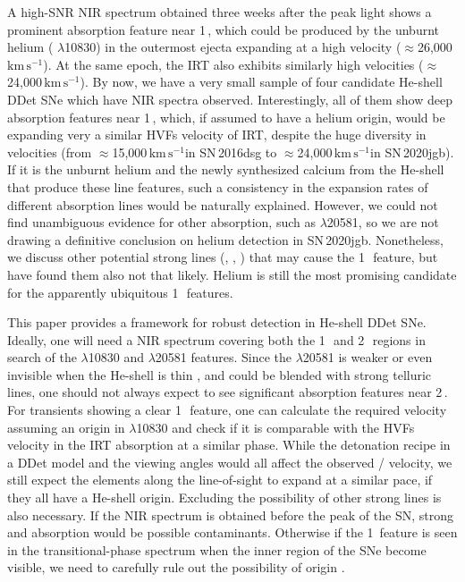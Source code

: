 \documentclass[twocolumn]{aastex631}
\newcommand{\sn}{SN\,2020jgb}
\newcommand{\kms}{$\mathrm{km}\,\mathrm{s}^{-1}$}
\begin{document}
A high-SNR NIR spectrum obtained three weeks after the peak light shows a prominent absorption feature near 1\,\micron, which could be produced by the unburnt helium ( $\lambda$10830) in the outermost ejecta expanding at a high velocity ($\approx$26,000\,\kms). At the same epoch, the  IRT also exhibits similarly high velocities ($\approx$24,000\,\kms). By now, we have a very small sample of four candidate He-shell DDet SNe which have NIR spectra observed. Interestingly, all of them show deep absorption features near 1\,\micron, which, if assumed to have a helium origin, would be expanding very a similar HVFs velocity of  IRT, despite the huge diversity in velocities (from $\approx$15,000\,\kms in SN\,2016dsg to $\approx$24,000\,\kms in \sn). If it is the unburnt helium and the newly synthesized calcium from the He-shell that produce these line features, such a consistency in the expansion rates of different absorption lines would be naturally explained. However, we could not find unambiguous evidence for other  absorption, such as  $\lambda$20581, so we are not drawing a definitive conclusion on helium detection in \sn. Nonetheless, we discuss other potential strong lines (, , ) that may cause the 1\,\micron\ feature, but have found them also not that likely. Helium is still the most promising candidate for the apparently ubiquitous 1\,\micron\ features.

This paper provides a framework for robust  detection in He-shell DDet SNe. 
Ideally, one will need a NIR spectrum covering both the 1\,\micron\ and 2\,\micron\ regions in search of the  $\lambda$10830 and $\lambda$20581 features. Since the  $\lambda$20581 is weaker or even invisible when the He-shell is thin \citep{Boyle2017_Helium}, and could be blended with strong telluric lines, one should not always expect to see significant absorption features near 2\,\micron. For transients showing a clear 1\,\micron\ feature, one can calculate the required velocity assuming an origin in  $\lambda$10830 and check if it is comparable with the HVFs velocity in the  IRT absorption at a similar phase. While the detonation recipe in a DDet model and the viewing angles would all affect the observed / velocity, we still expect the elements along the line-of-sight to expand at a similar pace, if they all have a He-shell origin. Excluding the possibility of other strong lines is also necessary. If the NIR spectrum is obtained before the peak of the SN, strong  and  absorption \citep{Hsiao_CSP_2019} would be possible contaminants. Otherwise if the 1\micron\ feature is seen in the transitional-phase spectrum when the inner region of the SNe become visible, we need to carefully rule out the possibility of  origin \citep{Marion2009_NIR}.
\end{document}
